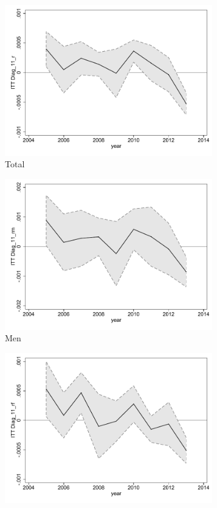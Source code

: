 \documentclass[a4paper ]{article}
\begin{document}
\begin{figure}[h!]
	\centering
	\begin{subfigure}[t]{0.31\textwidth}
		\centering
		\includegraphics[width=0.99\textwidth]{R1_LC_Diag_11_r}
		\caption{Total}		
	\end{subfigure}
	\begin{subfigure}[t]{0.31\textwidth}
		\centering
		\includegraphics[width=0.99\textwidth]{R1_LC_Diag_11_rm}
		\caption{Men}		
	\end{subfigure}
	\quad
	\begin{subfigure}[t]{0.31\textwidth}
		\centering
		\includegraphics[width=0.99\textwidth]{R1_LC_Diag_11_rf}

\end{subfigure}
\end{figure}
\end{document}
